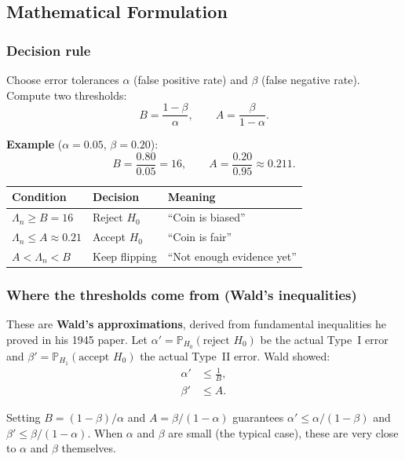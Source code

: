 \documentclass[12pt, a4paper]{article}
\newcommand{\Prob}{\mathbb{P}}         %
\newcommand{\LR}{\Lambda}              %
\begin{document}
\subsection{Mathematical Formulation}

\subsubsection*{Decision rule}

Choose error tolerances $\alpha$ (false positive rate) and $\beta$ (false
negative rate).  Compute two thresholds:
\[
  \boxed{B = \frac{1-\beta}{\alpha}}, \qquad
  \boxed{A = \frac{\beta}{1-\alpha}}.
\]

\textbf{Example} ($\alpha = 0.05$, $\beta = 0.20$):
\[
  B = \frac{0.80}{0.05} = 16, \qquad
  A = \frac{0.20}{0.95} \approx 0.211.
\]

\begin{center}
\begin{tabular}{@{} l l l @{}}
\toprule
\textbf{Condition} & \textbf{Decision} & \textbf{Meaning} \\
\midrule
$\LR_n \geq B = 16$        & Reject $H_0$  & ``Coin is biased'' \\
$\LR_n \leq A \approx 0.21$  & Accept $H_0$  & ``Coin is fair'' \\
$A < \LR_n < B$            & Keep flipping & ``Not enough evidence yet'' \\
\bottomrule
\end{tabular}
\end{center}

\subsubsection*{Where the thresholds come from (Wald's inequalities)}

These are \textbf{Wald's approximations}, derived from fundamental
inequalities he proved in his 1945 paper.  Let $\alpha' = \Prob_{H_0}(\text{reject } H_0)$
be the actual Type~I error and $\beta' = \Prob_{H_1}(\text{accept } H_0)$ the
actual Type~II error.  Wald showed:
\begin{align*}
  \alpha' &\leq \frac{1}{B}, \\
  \beta' &\leq A.
\end{align*}

Setting $B = (1-\beta)/\alpha$ and $A = \beta/(1-\alpha)$ guarantees
$\alpha' \leq \alpha/(1-\beta)$ and $\beta' \leq \beta/(1-\alpha)$.  When
$\alpha$ and $\beta$ are small (the typical case), these are very close to
$\alpha$ and $\beta$ themselves.
\end{document}
